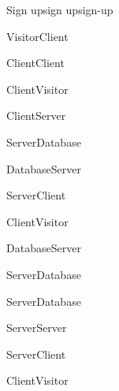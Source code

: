 \begin{sdfig}{Sign up}{sign up}{sign-up}

  \begin{umlcall}[op={Sign up}]{Visitor}{Client}
    \begin{umlcall}[op={Validate}]{Client}{Client}
      \begin{umlfragment}[type=alt, label=valid]
        \begin{umlcall}[type=return,op={Loading}]{Client}{Visitor}
          \begin{umlcall}[op={Sign up}]{Client}{Server}
            \begin{umlcall}[op={Has user}]{Server}{Database}
              \begin{umlfragment}[type=alt, label=true]
                \begin{umlcall}[type=return,op={Yes}]{Database}{Server}
                  \begin{umlcall}[type=return,op={Error}]{Server}{Client}
                    \begin{umlcall}[type=return,op={Error}]{Client}{Visitor}
                    \end{umlcall}
                  \end{umlcall}
                \end{umlcall}
                \umlfpart[else]
                \begin{umlcall}[type=return,op={No}]{Database}{Server}
                  \begin{umlcall}[op={Create user}]{Server}{Database}
                  \end{umlcall}
                  \begin{umlcall}[op={Create OTP}]{Server}{Database}
                    \begin{umlcall}[op={Send email}]{Server}{Server}
                      \begin{umlcall}[type=return,op={Done}]{Server}{Client}
                        \begin{umlcall}[type=return,op={Done}]{Client}{Visitor}
                        \end{umlcall}
                      \end{umlcall}
                    \end{umlcall}
                  \end{umlcall}

\end{umlcall}
\end{umlfragment}
\end{umlcall}
\end{umlcall}
\end{umlcall}
\end{umlfragment}
\end{umlcall}
\end{umlcall}
\end{sdfig}
